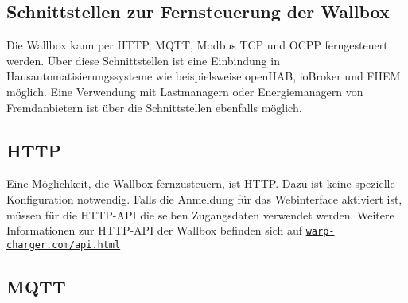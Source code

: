 \documentclass[a4paper,10pt]{article}
\newcommand\rurl[2]{%
  \href{#1}{\nolinkurl{#2}}%
}
\begin{document}
\begin{multicols*}{2}
    \newpage
    \section{Schnittstellen zur Fernsteuerung der Wallbox}\label{interfaces}
    Die Wallbox kann per HTTP, MQTT, Modbus TCP und OCPP ferngesteuert werden. Über diese Schnittstellen ist eine
    Einbindung in Hausautomatisierungssysteme wie beispielsweise openHAB, ioBroker und FHEM möglich.
    Eine Verwendung mit Lastmanagern oder Energiemanagern von Fremdanbietern
    ist über die Schnittstellen ebenfalls möglich.

    \subsection{HTTP}\label{http-interface}
    Eine Möglichkeit, die Wallbox fernzusteuern, ist HTTP. Dazu ist keine
    spezielle Konfiguration notwendig. Falls die Anmeldung für das Webinterface aktiviert ist, müssen für die HTTP-API die selben Zugangsdaten verwendet werden.
    Weitere Informationen zur HTTP-API der Wallbox befinden sich auf \rurl{https://warp-charger.com/api.html}{warp-charger.com/api.html}


    \subsection{MQTT}\label{mqtt-interface}


\end{multicols*}
\end{document}
